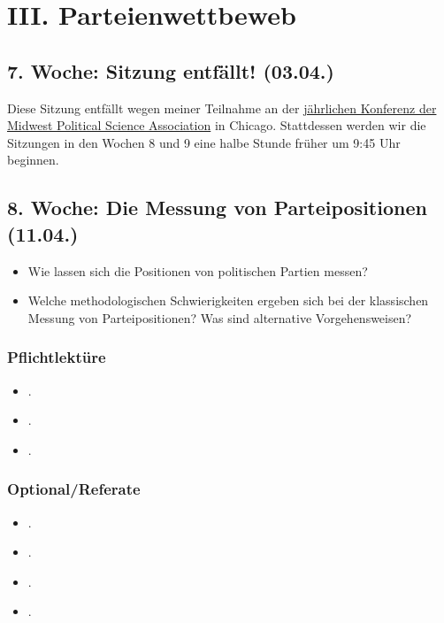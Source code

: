 \documentclass[abstract=on,parskip=full,headings=standardclasses,fontsize=11pt,paper=a4]{scrartcl}
\begin{document}
\section{III. Parteienwettbeweb}



\subsection{7. Woche:  Sitzung entfällt! (03.04.)}


Diese Sitzung entfällt wegen meiner Teilnahme an der \href{https://www.mpsanet.org/conference}{jährlichen Konferenz der  Midwest Political Science Association} in Chicago.
Stattdessen werden wir die Sitzungen in den Wochen 8 und 9 eine halbe Stunde früher  um 9:45 Uhr beginnen. 

\subsection{8. Woche: Die Messung von Parteipositionen (11.04.)}


\begin{itemize}
\renewcommand\labelitemi{--}
\item Wie lassen sich die Positionen von politischen Partien messen?
\item Welche methodologischen Schwierigkeiten ergeben sich bei der klassischen Messung von Parteipositionen? Was sind alternative Vorgehensweisen?
\end{itemize}

\subsubsection*{Pflichtlektüre}
\begin{itemize}
\item {}.
\item {}.
\item {}.
\end{itemize}


\subsubsection*{Optional/Referate}
\begin{itemize}
\item {}.
\item {}.
\item {}.
\item {}.
\end{itemize}
\end{document}
